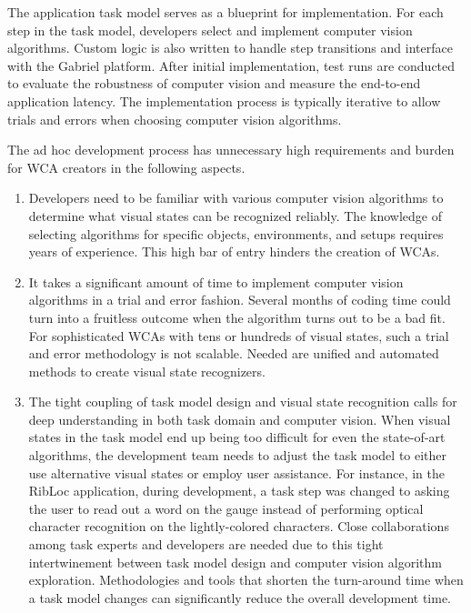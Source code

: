 The application task model serves as a blueprint for implementation. For each step
in the task model, developers select and implement computer vision algorithms.
Custom logic is also written to handle step transitions and interface with the
Gabriel platform. After initial implementation, test runs are conducted to
evaluate the robustness of computer vision and measure the end-to-end
application latency. The implementation process is typically iterative to allow
trials and errors when choosing computer vision algorithms.

The ad hoc development process has unnecessary high requirements and burden for
WCA creators in the following aspects.
\begin{enumerate}
  \item Developers need to be familiar with various computer vision algorithms
        to determine what visual states can be recognized reliably. The knowledge of
        selecting algorithms for specific objects, environments, and setups requires
        years of experience. This high bar of entry hinders the creation of WCAs.
  \item It takes a significant amount of time to implement computer vision
        algorithms in a trial and error fashion. Several months of coding time could
        turn into a fruitless outcome when the algorithm turns out to be a bad fit. For
        sophisticated WCAs with tens or hundreds of visual states, such a trial and
        error methodology is not scalable. Needed are unified and automated methods to
        create visual state recognizers.
  \item The tight coupling of task model design and visual state recognition
        calls for deep understanding in both task domain and computer vision. When
        visual states in the task model end up being too difficult for even the
        state-of-art algorithms, the development team needs to adjust the task model to
        either use alternative visual states or employ user assistance. For instance, in
        the RibLoc application, during development, a task step was changed to asking
        the user to read out a word on the gauge instead of performing optical character
        recognition on the lightly-colored characters. Close collaborations among task
        experts and developers are needed due to this tight intertwinement between task
        model design and computer vision algorithm exploration. Methodologies and tools
        that shorten the turn-around time when a task model changes can significantly
        reduce the overall development time.
\end{enumerate}


